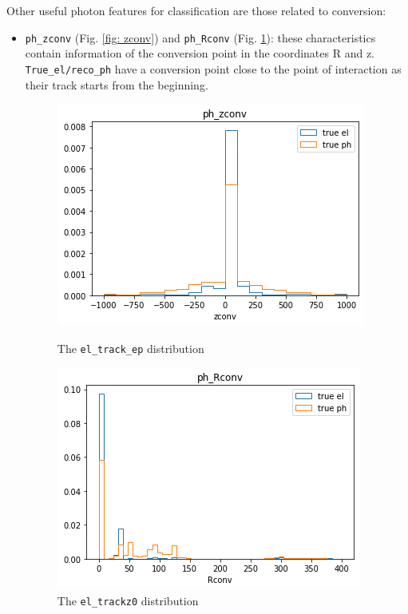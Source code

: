 \documentclass[a4paper, oneside]{book}
\begin{document}
					Other useful photon features for classification are those related to conversion:
					\begin{itemize}
						\item \texttt{ph\_zconv} (Fig. \ref{fig: zconv}) and \texttt{ph\_Rconv} (Fig. \ref{fig: Rconv}): these characteristics contain information of the conversion point in the coordinates R and z. \texttt{True\_el/reco\_ph} have a conversion point close to the point of interaction as their track starts from the beginning.
						
						\begin{figure}[h!]
							\begin{minipage}[b]{0.5\linewidth}
								\centering
								\includegraphics[width=.9\linewidth]{tesi_images/ph_zconv.png} 
								\caption{The \texttt{el\_track\_ep} distribution} 
								\label{fig: zconv}
								\vspace{4ex}
							\end{minipage}%
							\begin{minipage}[b]{0.5\linewidth}
								\centering
								\includegraphics[width=.9\linewidth]{tesi_images/ph_Rconv.png} 
								\caption{The \texttt{el\_trackz0} distribution}
								\label{fig: Rconv} 
								\vspace{4ex}
							\end{minipage} 
						\end{figure}
						

\end{itemize}
\end{document}
